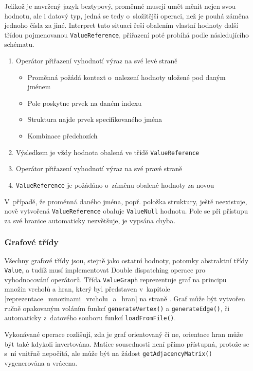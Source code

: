 \documentclass[11pt,twoside,a4paper]{book}
\begin{document}
Jelikož je navržený jazyk beztypový, proměnné musejí umět měnit nejen svou hodnotu, ale i datový typ, jedná se tedy o~složitější operaci, než je pouhá záměna jednoho čísla za jiné. Interpret tuto situaci řeší obalením vlastní hodnoty další třídou pojmenovanou \texttt{ValueReference}, přiřazení poté probíhá podle následujícího schématu.

\begin{enumerate}
\item Operátor přiřazení vyhodnotí výraz na své levé straně
	\begin{itemize}
	\item Proměnná požádá kontext o~nalezení hodnoty uložené pod daným jménem
	\item Pole poskytne prvek na daném indexu
	\item Struktura najde prvek specifikovaného jména
	\item Kombinace předchozích
	\end{itemize}
\item Výsledkem je vždy hodnota obalená ve třídě \texttt{ValueReference}
\item Operátor přiřazení vyhodnotí výraz na své pravé straně
\item \texttt{ValueReference} je požádáno o~záměnu obalené hodnoty za novou
\end{enumerate}

V~případě, že proměnná daného jména, popř. položka struktury, ještě neexistuje, nově vytvořená \texttt{ValueReference} obaluje \texttt{ValueNull} hodnotu. Pole se při přístupu za své hranice automaticky nezvětšuje, je vypsána chyba.


\subsubsection{Grafové třídy}

Všechny grafové třídy jsou, stejně jako ostatní hodnoty, potomky abstraktní třídy \texttt{Value}, a tudíž musí implementovat Double dispatching operace pro vyhodnocování operátorů. Třída \texttt{ValueGraph} reprezentuje graf na principu množin vrcholů a hran, který byl představen v~kapitole \ref{reprezentace_mnozinami_vrcholu_a_hran} na straně \pageref{reprezentace_mnozinami_vrcholu_a_hran}. Graf může být vytvořen ručně opakovaným voláním funkcí \texttt{generateVertex()} a \texttt{generateEdge()}, či automaticky z~datového souboru funkcí \texttt{lo\-ad\-From\-Fi\-le()}.

Vykonávané operace rozlišují, zda je graf orientovaný či ne, orientace hran může být také kdykoli invertována. Matice sousednosti není přímo přístupná, protože se s~ní vnitřně nepočítá, ale může být na žádost \texttt{getAdjacencyMatrix()} vygenerována a vrácena.
\end{document}
